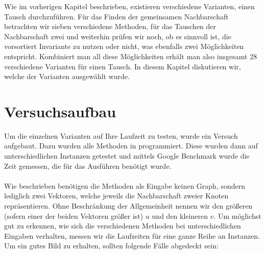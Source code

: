 \label{cap:tests}
Wie im vorherigen Kapitel beschrieben, existieren verschiedene Varianten, einen \gc{} Tausch 
durchzuführen. Für das Finden der gemeinsamen Nachbarschaft betrachten wir sieben verschiedene Methoden, 
für das Tauschen der Nachbarschaft zwei und weiterhin prüfen wir noch, ob es sinnvoll ist, 
die vorsortiert Invariante zu nutzen oder nicht, was ebenfalls zwei Möglichkeiten entspricht.
Kombiniert man all diese Möglichkeiten erhält man also insgesamt 28 verschiedene Varianten für einen \gc{} 
Tausch.
In diesem Kapitel diskutieren wir, welche der Varianten ausgewählt wurde.

\section{Versuchsaufbau}
Um die einzelnen Varianten auf Ihre Laufzeit zu testen, wurde ein Versuch aufgebaut.
Dazu wurden alle Methoden in \cpp programmiert. Diese wurden dann auf unterschiedlichen
Instanzen getestet und mittels Google Benchmark \cite{benchmark} wurde die Zeit gemessen, 
die für das Ausführen benötigt wurde.
\\
\\
Wie %
beschrieben benötigen die Methoden als Eingabe keinen Graph, 
sondern lediglich zwei Vektoren, welche jeweils die Nachbarschaft zweier Knoten repräsentieren. Ohne 
Beschränkung der Allgemeinheit nennen wir den größeren (sofern einer der beiden Vektoren größer ist)
$u$ und den kleineren $v$.
Um möglichst gut zu erkennen, wie sich die verschiedenen Methoden bei unterschiedlichen
Eingaben verhalten, messen wir die Laufzeiten für eine ganze Reihe an Instanzen. 
Um ein gutes Bild zu erhalten, sollten folgende Fälle abgedeckt sein:

